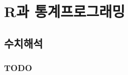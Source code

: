 \documentclass[../tutorial.tex]{subfiles}
\begin{document}
\part{R과 통계프로그래밍}

\chapter{수치해석}



\section{TODO}
\end{document}
